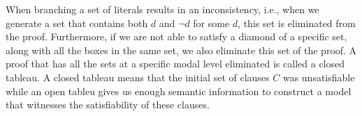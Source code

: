 When branching a set of literals results in an inconsistency, i.e., when we
generate a set that contains both $d$ and $\neg d$ for some $d$, this set is
eliminated from the proof. Furthermore, if we are not able to satisfy a diamond
of a specific set, along with all the boxes in the same set, we also eliminate
this set of the proof. A proof that has all the sets at a specific modal level
eliminated is called a closed tableau. A closed tableau means that the initial set
of clauses $C$ was unsatisfiable while an open tableu gives us enough
semantic information to construct a model that witnesses the satisfiability of
these clauses.

